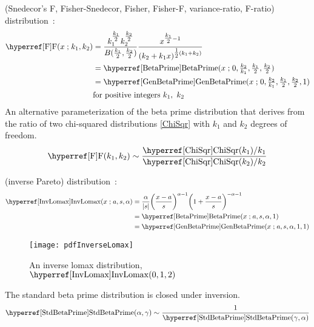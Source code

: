 (Snedecor's F, Fisher-Snedecor, Fisher, Fisher-F, variance-ratio, F-ratio) distribution~\cite{Snedecor1934, Aroian1941, Johnson1995}:
\begin{align}
\label{F}
\opr{F}(x\given k_1,k_2) &= \frac{k_1^{\tfrac{k_1}{2} }   k_2^{\tfrac{k_2}{2}}}{ B(\tfrac{k_1}{2}, \tfrac{k_2}{2})    }
 \frac{x^{\tfrac{k_1}{2} -1}}{(k_2 + k_1 x)^{\tfrac{1}{2}(k_1+k_2)}} \checked
 \\ & =  \opr{BetaPrime}(x\given  0,\tfrac{k_2}{k_1}, \tfrac{k_1}{2},\tfrac{k_2}{2}) \notag \checked
 \\ & =  \opr{GenBetaPrime}(x\given  0,\tfrac{k_2}{k_1}, \tfrac{k_1}{2},\tfrac{k_2}{2},1) \checked
 \notag
\\ & \text{for positive integers } k_1,\ k_2 \notag \checked
\end{align}
An alternative parameterization of the beta prime distribution that derives from the ratio of two chi-squared distributions \eqref{ChiSqr} with $k_1$ and $k_2$ degrees of freedom.
\[
\opr{F}(k_1,k_2) \sim \frac{\opr{ChiSqr}(k_1) / k_1 }{\opr{ChiSqr}(k_2) / k_2} \checked
\notag
\]



 (inverse Pareto) distribution~\cite{Kleiber2003}: 
\begin{align}
\label{InvLomax}
\opr{InvLomax}(x\given a, s,\alpha) &= \frac{\alpha}{|s|} \Left(\frac{x-a}{s}\Right)^{\alpha -1} \Left(1+\frac{x-a}{s}\Right)^{-\alpha-1} \checked
\\ \notag &= \opr{BetaPrime}(x\given a, s, \alpha,1) \checked
\\ \notag &= \opr{GenBetaPrime}(x\given a, s, \alpha,1,1) \checked
\end{align}


\begin{figure}[tp!]
\begin{center}
\texttt{[image: pdfInverseLomax]}
\end{center}
\caption[Inverse Lomax distribution]{An inverse lomax distribution, $\opr{InvLomax}(0, 1, 2)$}
\end{figure}







The standard beta prime distribution is closed under inversion.
\[
\opr{StdBetaPrime}(\alpha,\gamma) \sim \frac{1}{\opr{StdBetaPrime}(\gamma,\alpha)} \checked
\notag
\]


